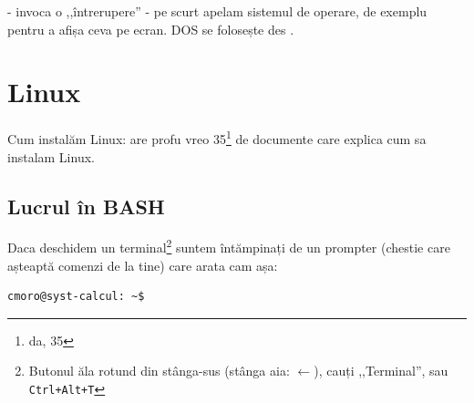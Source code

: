\documentclass[11pt,a4paper]{article}
\begin{document}
\quad \quad {} - invoca o ,,întrerupere'' - pe scurt apelam sistemul de operare, de exemplu pentru a afișa ceva pe ecran. DOS se folosește des \href{http://spike.scu.edu.au/~barry/interrupts.html}{}.

\section{Linux}
Cum instalăm Linux: are profu vreo 35\footnote{da, 35} de documente care explica cum sa instalam Linux.

\subsection*{Lucrul în BASH}
Daca deschidem un terminal\footnote{Butonul ăla rotund din stânga-sus
  (stânga aia: $\leftarrow$), cauți ,,Terminal'', sau \texttt{Ctrl+Alt+T}}
suntem întămpinați de un prompter (chestie care așteaptă comenzi de la tine) care arata cam așa:
\begin{verbatim}
cmoro@syst-calcul: ~$
\end{verbatim}
\end{document}
